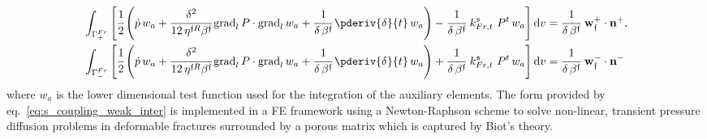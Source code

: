 \small
\begin{align}
\label{eq:s_coupling_weak_inter}
\begin{split}
&\int_{\Gamma^{Fr}_+} \left[\cfrac{1}{2} \left(\dot{p} \,w_{a}  + \cfrac{\delta^2}{{12 \,\eta^{\mathfrak{f}R}} \beta^\mathfrak{f}} \, \text{grad}_l \, P \cdot \text{grad}_l \, w_{a} + \cfrac{1}{\delta\, \beta^\mathfrak{f}} \,\pderiv{\delta}{t} \,w_{a}\right)  - \cfrac{1}{\delta\, \beta^\mathfrak{f}} \ k^\mathfrak{s}_{Fr,t} \ P^t \,w_a \right] \text{d}v = \cfrac{1}{\delta \, \beta^\mathfrak{f}} \ \mathbf{w}^+_\mathfrak{f} \cdot \mathbf{n^+}, \\
&\int_{\Gamma^{Fr}_-} \left[\cfrac{1}{2} \left( \dot{p} \,w_{a}  + \cfrac{\delta^2}{{12 \,\eta^{\mathfrak{f}R}} \beta^\mathfrak{f}} \, \text{grad}_l \, P \cdot \text{grad}_l \, w_{a} + \cfrac{1}{\delta\, \beta^\mathfrak{f}} \,\pderiv{\delta}{t} \,w_{a} \right) + \cfrac{1}{\delta\, \beta^\mathfrak{f}} \ k^\mathfrak{s}_{Fr,t} \ P^t \,w_a \right] \text{d}v =\cfrac{1}{\delta \,\beta^\mathfrak{f}} \ \mathbf{w}^-_\mathfrak{f} \cdot \mathbf{n^-}
\end{split}
\end{align}
\normalsize
where $w_a$ is the lower dimensional test function used for the integration of the auxiliary elements. The form provided by eq.~\eqref{eq:s_coupling_weak_inter} is implemented in a FE framework using a Newton-Raphson scheme to solve non-linear, transient pressure diffusion problems in deformable fractures surrounded by a porous matrix which is captured by Biot's theory.